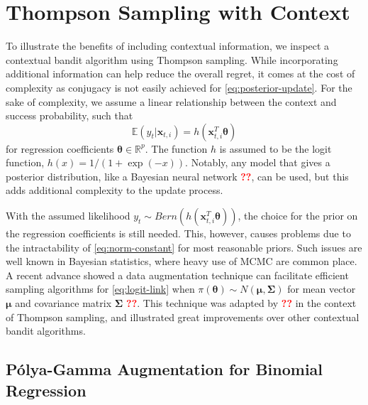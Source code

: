 \documentclass[12pt]{article}
\newcommand{\bred}[1]{\textbf{\textcolor{red}{#1}}}
\begin{document}
\section{Thompson Sampling with Context}

To illustrate the benefits of including contextual information, we inspect a 
contextual bandit algorithm using Thompson sampling.
While incorporating additional information can help reduce the overall regret, 
it comes at the cost of complexity as conjugacy is not easily achieved for 
\eqref{eq:posterior-update}.
For the sake of complexity, we assume a linear relationship between the context 
and success probability, such that
\begin{equation}
\mathbb{E}(y_t \vert \bm{x}_{t,i}) = h(\bm{x}_{t,i}^T \bm{\theta})
\label{eq:logit-link}
\end{equation}
for regression coefficients $\bm{\theta} \in \mathbb{R}^p$. 
The function $h$ is assumed to be the logit function, 
$h(x) = 1 / (1 + \exp(-x))$.
Notably, any model that gives a posterior distribution, like a Bayesian neural network 
\bred{??}, can be used, but this adds additional complexity to the update process.

With the assumed likelihood $y_t \sim Bern(h(\bm{x}_{t,i}^T \bm{\theta}))$, the
choice for the prior on the regression coefficients is still needed.
This, however, causes problems due to the intractability of \eqref{eq:norm-constant}
for most reasonable priors.
Such issues are well known in Bayesian statistics, where heavy use of MCMC are 
common place.
A recent advance showed a data augmentation technique can facilitate efficient
sampling algorithms for \eqref{eq:logit-link} when 
$\pi(\bm{\theta}) \sim N(\bm{\mu}, \bm{\Sigma})$ 
for mean vector $\bm{\mu}$ and covariance matrix $\bm{\Sigma}$ \bred{??}.
This technique was adapted by \bred{??} in the context of Thompson sampling, 
and illustrated great improvements over other contextual bandit algorithms.

\subsection{P\'olya-Gamma Augmentation for Binomial Regression}
\end{document}
